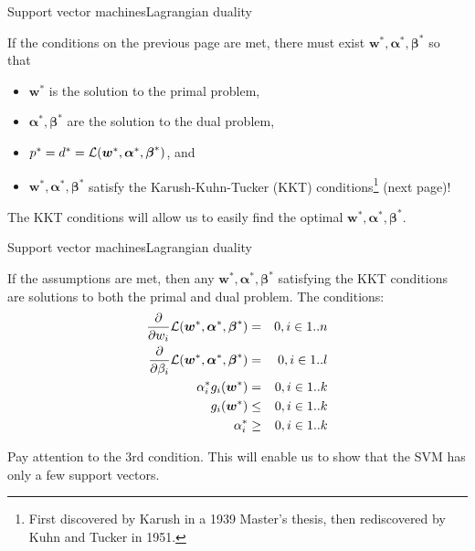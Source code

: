 \documentclass{beamer}
\renewcommand{\vec}[1]{\boldsymbol{#1}}
\begin{document}
\begin{frame}{Support vector machines}{Lagrangian duality}

  If the conditions on the previous page are met,
  there must exist $\vec{w}^*,\vec{\alpha}^*,\vec{\beta}^*$ so
  that
  \begin{itemize}
  \item  $\vec{w}^*$ is the solution to the primal problem,
  \item $\vec{\alpha}^*,\vec{\beta}^*$ are the solution to the dual problem,
  \item $p^*=d^*={\cal L}(\vec{w}^*,\vec{\alpha}^*,\vec{\beta}^*)$, and
  \item $\vec{w}^*,\vec{\alpha}^*,\vec{\beta}^*$ satisfy the
    \alert{Karush-Kuhn-Tucker (KKT) conditions}\footnote{First discovered
    by Karush in a 1939 Master's thesis, then rediscovered by Kuhn and
    Tucker in 1951.} (next page)!
  \end{itemize}

  The KKT conditions will allow us to easily find the optimal
  $\vec{w}^*,\vec{\alpha}^*,\vec{\beta}^*$.
  
\end{frame}


\begin{frame}{Support vector machines}{Lagrangian duality}

  If the assumptions are met, then 
  any $\vec{w}^*,\vec{\alpha}^*,\vec{\beta}^*$ satisfying the KKT
  conditions are solutions to both the primal and dual problem. The conditions:
  \begin{eqnarray}
    \frac{\partial}{\partial w_i}{\cal L}(\vec{w}^*,\vec{\alpha}^*,\vec{\beta}^*) & = & 0, i \in 1..n \nonumber \\
    \frac{\partial}{\partial \beta_i}{\cal L}(\vec{w}^*,\vec{\alpha}^*,\vec{\beta}^*) & = & 0, i \in 1..l \nonumber \\
    \alpha_i^*g_i(\vec{w}^*) & = & 0, i \in 1..k \nonumber \\
    g_i(\vec{w}^*) & \le & 0, i \in 1..k \nonumber \\
    \alpha_i^* & \ge & 0, i \in 1..k \nonumber
  \end{eqnarray}

  Pay attention to the 3rd condition. This will enable us to show that
  the SVM has only a few support vectors.

\end{frame}
\end{document}
